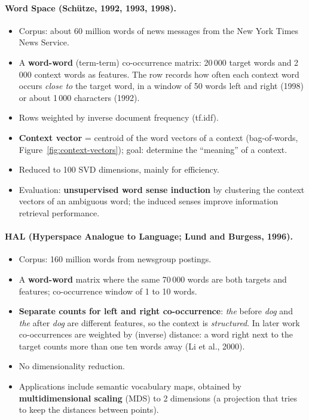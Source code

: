 \paragraph{Word Space (Schütze, 1992, 1993, 1998).}
\begin{itemize}[nosep]
  \item Corpus: about 60 million words of news messages from the New York Times News
        Service.
  \item A \textbf{word-word} (term-term) co-occurrence matrix: 20\,000 target words and
        2\,000 context words as features. The row records how often each context word
        occurs \emph{close to} the target word, in a window of 50 words left and right
        (1998) or about 1\,000 characters (1992).
  \item Rows weighted by inverse document frequency (tf.idf).
  \item \textbf{Context vector} = centroid of the word vectors of a context
        (bag-of-words, Figure~\ref{fig:context-vectors}); goal: determine the
        ``meaning'' of a context.
  \item Reduced to 100 SVD dimensions, mainly for efficiency.
  \item Evaluation: \textbf{unsupervised word sense induction} by clustering the
        context vectors of an ambiguous word; the induced senses improve information
        retrieval performance.
\end{itemize}

\paragraph{HAL (Hyperspace Analogue to Language; Lund and Burgess, 1996).}
\begin{itemize}[nosep]
  \item Corpus: 160 million words from newsgroup postings.
  \item A \textbf{word-word} matrix where the same 70\,000 words are both targets and
        features; co-occurrence window of 1 to 10 words.
  \item \textbf{Separate counts for left and right co-occurrence}: \emph{the} before
        \emph{dog} and \emph{the} after \emph{dog} are different features, so the
        context is \emph{structured}. In later work co-occurrences are weighted by
        (inverse) distance: a word right next to the target counts more than one ten
        words away (Li et al., 2000).
  \item No dimensionality reduction.
  \item Applications include semantic vocabulary maps, obtained by
        \textbf{multidimensional scaling} (MDS) to 2 dimensions (a projection that
        tries to keep the distances between points).
\end{itemize}

